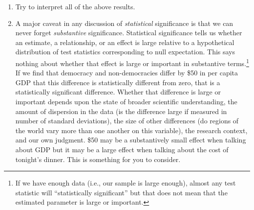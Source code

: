 \documentclass[a4paper,12pt]{article}
\begin{document}
\begin{enumerate}
\item Try to interpret all of the above results.

\item A major caveat in any discussion of \textit{statistical} significance is that we can never forget \textit{substantive} significance. Statistical significance tells us whether an estimate, a relationship, or an effect is large relative to a hypothetical distribution of test statistics corresponding to null expectation. This says nothing about whether that effect is large or important in substantive terms.\footnote{If we have enough data (i.e., our sample is large enough), almost any test statistic will ``statistically significant'' but that does not mean that the estimated parameter is large or important.} If we find that democracy and non-democracies differ by \$50 in per capita GDP that this difference is statistically different from zero, that is a statistically significant difference. Whether that difference is large or important depends upon the state of broader scientific understanding, the amount of dispersion in the data (is the difference large if measured in number of standard deviations), the size of other differences (do regions of the world vary more than one another on this variable), the research context, and our own judgment. \$50 may be a substantively small effect when talking about GDP but it may be a large effect when talking about the cost of tonight's dinner. This is something for you to consider.


\end{enumerate}
\end{document}
